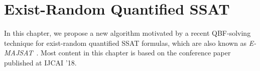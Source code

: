 \chapter{Exist-Random Quantified SSAT}
\label{chap:exist-random-ssat}

In this chapter, we propose a new algorithm motivated by a recent QBF-solving technique for exist-random quantified SSAT formulas, which are also known as \textit{E-MAJSAT}~\cite{Littman1998}.
Most content in this chapter is based on the conference paper~\cite{LeeIJCAI18ERSSAT} published at IJCAI '18.




